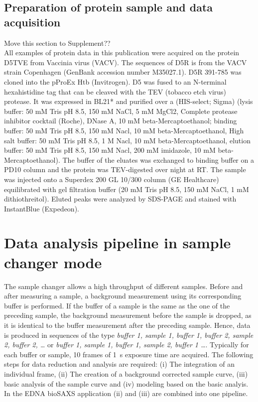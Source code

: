 \documentclass[preprint,pdf]{iucr}              %
\begin{document}
\subsection{Preparation of protein sample and data acquisition}
 Move this section to Supplement??\\
All examples of protein data in this publication were acquired on the protein D5TVE from Vaccinia virus (VACV).
The sequences of D5R is from the VACV strain Copenhagen (GenBank accession number M35027.1). D5R 391-785 was cloned into the pProEx Htb (Invitrogen). D5 was fused to an N-terminal hexahistidine tag that can be cleaved with the TEV (tobacco etch virus) protease. It was expressed in BL21* and purified over a (HIS-select; Sigma) (lysis buffer: 50 mM Tris pH 8.5, 150 mM NaCl, 5 mM MgCl2, Complete protease inhibitor cocktail (Roche), DNase A, 10 mM beta-Mercaptoethanol; binding buffer: 50 mM Tris pH 8.5, 150 mM Nacl, 10 mM beta-Mercaptoethanol, High salt buffer: 50 mM Tris pH 8.5, 1 M Nacl, 10 mM beta-Mercaptoethanol, elution buffer: 50 mM Tris pH 8.5, 150 mM Nacl,  200 mM imidazole, 10 mM beta-Mercaptoethanol). The buffer of the eluates was exchanged to binding buffer on a PD10 column and the protein was TEV-digested over night at RT. The sample was injected onto a Superdex 200 GL 10/300 column (GE Healthcare) equilibrated with gel filtration buffer (20 mM Tris pH 8.5, 150 mM NaCl, 1 mM dithiothreitol). Eluted peaks were analyzed by SDS-PAGE and stained with InstantBlue (Expedeon). 


\section{Data analysis pipeline in sample changer mode}

The sample changer allows a high throughput of different samples. Before and after measuring a sample, a background measurement using its corresponding buffer is performed. If the buffer of a sample is the same as the one of the preceding sample, the background measurement before the sample is dropped, as it is identical to the buffer measurement after the preceding sample. Hence, data is produced in sequences of the type \textit{buffer 1, sample 1, buffer 1, buffer 2, sample 2, buffer 2, \ldots} or  \textit{buffer 1, sample 1, buffer 1,  sample 2, buffer 1 \ldots}. Typically for each buffer or sample, 10 frames of 1~s exposure time are acquired. The following steps for data reduction and analysis are required:
(i) The integration of an individual frame, (ii) The creation of a background corrected sample curve, (iii) basic analysis of the sample curve and (iv) modeling based on the basic analyis. In the EDNA bioSAXS application (ii) and (iii) are combined into one pipeline.
\end{document}
